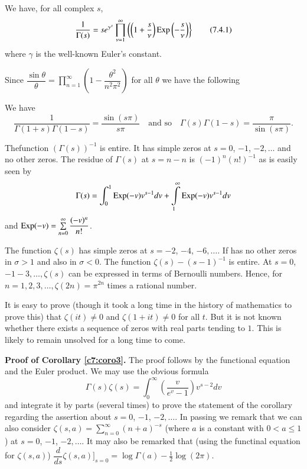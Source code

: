 \begin{theorem}\label{c7:thm7.4.1}
We have, for all complex $s$,
\begin{equation*}
\frac{1}{\Gamma(s)}=se^{\gamma^{s}}\prod^{\infty}_{\nu=1}\left(\left(1+\frac{s}{\nu}\right)\operatorname{Exp}
\left(-\frac{s}{\nu}\right)\right\}\tag{7.4.1}\label{c7:eq7.4.1} 
\end{equation*}
where $\gamma$ is the well-known Euler's constant.
\end{theorem}

Since $\dfrac{\sin
 \theta}{\theta}=\prod\limits^{\infty}_{n=1}\left(1-\dfrac{\theta^{2}}{n^{2}\pi^{2}}\right)$
for all $\theta$ we have the following

\begin{corollary}\label{c7:coro1}
We have
$$
\frac{1}{\Gamma(1+s)\Gamma(1-s)}=\frac{\sin(s\pi)}{s\pi}\quad\text{and
  so}\quad \Gamma(s)\Gamma(1-s)=\frac{\pi}{\sin(s\pi)}. 
$$
\end{corollary}

\begin{corollary}\label{c7:coro2}
The\pageoriginale function $(\Gamma(s))^{-1}$ is entire. It has simple
zeros at $s=0$, $-1$, $-2,\ldots$ and no other zeros. The residue of
$\Gamma(s)$ at $s=n-n$ is $(-1)^{n}(n!)^{-1}$ as is easily seen by
$$
\Gamma(s)=\int^{1}_{0}\operatorname{Exp}(-v)v^{s-1}dv+\int\limits^{\infty}_{1}\operatorname{Exp}(-v)v^{s-1}dv
$$
and $\operatorname{Exp}(-v)=\sum\limits^{\infty}_{n=0}\dfrac{(-v)^{n}}{n!}$.
\end{corollary}

\begin{corollary}\label{c7:coro3}
The function $\zeta(s)$ has simple zeros at $s=-2$, $-4$,
$-6,\ldots$. If has no other zeros in $\sigma>1$ and also in
$\sigma<0$. The function $\zeta(s)-(s-1)^{-1}$ is entire. At $s=0$,
$-1-3,\ldots,\zeta(s)$ can be expressed in terms of Bernoulli
numbers. Hence, for $n=1,2,3,\ldots,\zeta(2n)=\pi^{2n}$ times a
rational number.
\end{corollary}

\begin{remark*}
It is easy to prove (though it took a long time in the history of
mathematics to prove this) that $\zeta(it)\neq 0$ and $\zeta(1+it)\neq
0$ for all $t$. But it is not known whether there exists a sequence of
zeros with real parts tending to $1$. This is likely to remain
unsolved for a long time to come.
\end{remark*}

\noindent
{\bf Proof of Corollary \ref{c7:coro3}.} The proof follows by the
functional equation and the Euler product. We may use the obvious
formula
$$
\Gamma(s)\zeta(s)=\int^{\infty}_{0}\left(\frac{v}{e^{v}-1}\right)v^{s-2}dv
$$
and integrate it by parts (several times) to prove the statement of
the corollary regarding the assertion about $s=0$, $-1$,
$-2,\ldots$. In passing we remark that we can also consider
$\zeta(s,a)=\sum\limits^{\infty}_{n=0}(n+a)^{-s}$ (where $a$ is a
constant with $0<a\leq 1$) at $s=0$, $-1$, $-2,\ldots$. It may also be
remarked that (using the functinal equation for $\zeta(s,a)$)
$\dfrac{d}{ds}\zeta(s,a)]_{s=0}=\log\Gamma(a)-\frac{1}{2}\log (2\pi)$.

